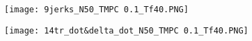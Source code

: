 \begin{figure}[h!]
	\centering
	\texttt{[image: 9jerks\_N50\_TMPC 0.1\_Tf40.PNG]}
\end{figure}

\begin{figure}[h!]
	\centering
	\texttt{[image: 14tr\_dot\&delta\_dot\_N50\_TMPC 0.1\_Tf40.PNG]}
\end{figure}














